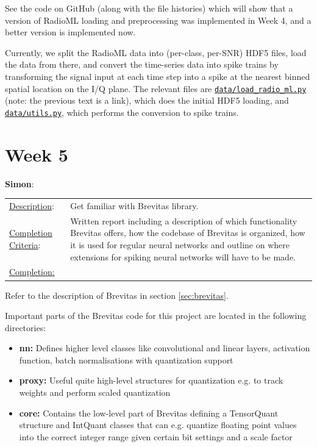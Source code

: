 \documentclass[parskip=true, 10pt]{scrartcl}
\begin{document}
See the code on GitHub (along with the file histories) which will show that a version of RadioML loading and preprocessing was implemented in Week 4, and a better version is implemented now.

Currently, we split the RadioML data into (per-class, per-SNR) HDF5 files, load the data from there, and convert the time-series data into spike trains by transforming the signal input at each time step into a spike at the nearest binned spatial location on the I/Q plane. The relevant files are \href{https://github.com/ohjay/snn-modulation-classification/blob/master/data/load_radio_ml.py}{{\tt data/load\_radio\_ml.py}} (note: the previous text is a link), which does the initial HDF5 loading, and \href{https://github.com/ohjay/snn-modulation-classification/blob/master/data/utils.py}{{\tt data/utils.py}}, which performs the conversion to spike trains.

\section*{Week 5}

\textsf{\textbf{Simon}}: 

\begin{tabularx}{\textwidth}{p{3.5cm} p{10cm}}
\underline{Description}: & Get familiar with Brevitas library.\\

\underline{Completion Criteria}: & Written report including a description of which functionality Brevitas offers, how the codebase of Brevitas is organized, how it is used for regular neural networks and outline on where extensions for spiking neural networks will have to be made.\\
\underline{Completion:} &
\end{tabularx}

Refer to the description of Brevitas in section \ref{sec:brevitas}.

Important parts of the Brevitas code for this project are located in the following directories:
\begin{itemize}[noitemsep]
\item{\textbf{\textsf{nn:}} Defines higher level classes like convolutional and linear layers, activation function, batch normalisations with quantization support}
\item{\textbf{\textsf{proxy:}} Useful quite high-level structures for quantization e.g. to track weights and perform scaled quantization}
\item{\textbf{\textsf{core:}} Contains the low-level part of Brevitas defining a TensorQuant structure and IntQuant classes that
can e.g. quantize floating point values into the correct integer range given certain bit settings and a scale factor}
\end{itemize}
\end{document}
